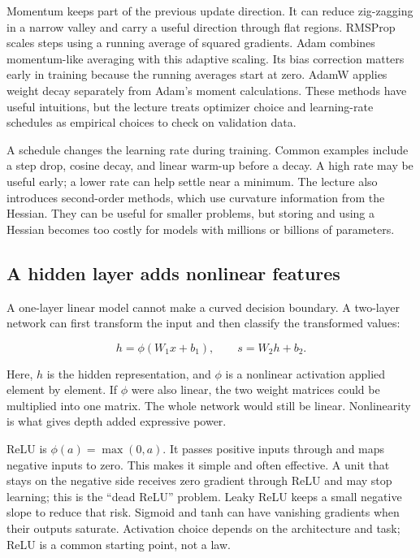 Momentum keeps part of the previous update direction. It can reduce zig-zagging in a narrow valley and carry a useful direction through flat regions. RMSProp scales steps using a running average of squared gradients. Adam combines momentum-like averaging with this adaptive scaling. Its bias correction matters early in training because the running averages start at zero. AdamW applies weight decay separately from Adam's moment calculations. These methods have useful intuitions, but the lecture treats optimizer choice and learning-rate schedules as empirical choices to check on validation data.

A schedule changes the learning rate during training. Common examples include a step drop, cosine decay, and linear warm-up before a decay. A high rate may be useful early; a lower rate can help settle near a minimum. The lecture also introduces second-order methods, which use curvature information from the Hessian. They can be useful for smaller problems, but storing and using a Hessian becomes too costly for models with millions or billions of parameters.

\subsection{A hidden layer adds nonlinear features}\label{04-visual-computing-ii-ch031-a-hidden-layer-adds-nonlinear-features}

\hypertarget{04-visual-computing-ii-ch031-a-hidden-layer-adds-nonlinear-features}{}

A one-layer linear model cannot make a curved decision boundary. A two-layer network can first transform the input and then classify the transformed values:

\[h=\phi(W_1x+b_1),\qquad s=W_2h+b_2.\]

Here, \(h\) is the hidden representation, and \(\phi\) is a nonlinear activation applied element by element. If \(\phi\) were also linear, the two weight matrices could be multiplied into one matrix. The whole network would still be linear. Nonlinearity is what gives depth added expressive power.

ReLU is \(\phi(a)=\max(0,a)\). It passes positive inputs through and maps negative inputs to zero. This makes it simple and often effective. A unit that stays on the negative side receives zero gradient through ReLU and may stop learning; this is the ``dead ReLU'' problem. Leaky ReLU keeps a small negative slope to reduce that risk. Sigmoid and tanh can have vanishing gradients when their outputs saturate. Activation choice depends on the architecture and task; ReLU is a common starting point, not a law.

